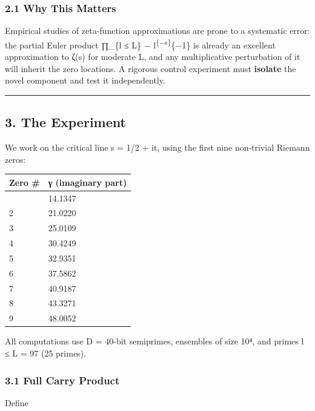 \documentclass[
  11pt,
]{article}
\begin{document}
\subsubsection{2.1 Why This Matters}\label{why-this-matters}

Empirical studies of zeta-function approximations are prone to a systematic
error: the partial Euler product ∏\_\{l ≤ L\}  −
l\textsuperscript{\{−s\}\textbar{}}\{−1\} is already an excellent approximation
to \textbar ζ(s)\textbar{} for moderate L, and any multiplicative perturbation
of it will inherit the zero locations. A rigorous control experiment must
\textbf{isolate} the novel component and test it independently.

\begin{center}\rule{0.5\linewidth}{0.5pt}\end{center}

\newpage

\subsection{3. The Experiment}\label{the-experiment}

We work on the critical line s = 1/2 + it, using the first nine non-trivial
Riemann zeros:

\begin{longtable}[]{@{}ll@{}}
\toprule\noalign{}
Zero \# & γ (imaginary part) \\
\midrule\noalign{}
\endhead
\bottomrule\noalign{}
\endlastfoot
1 & 14.1347 \\
2 & 21.0220 \\
3 & 25.0109 \\
4 & 30.4249 \\
5 & 32.9351 \\
6 & 37.5862 \\
7 & 40.9187 \\
8 & 43.3271 \\
9 & 48.0052 \\
\end{longtable}

All computations use D = 40-bit semiprimes, ensembles of size 10⁴, and primes l
≤ L = 97 (25 primes).

\subsubsection{3.1 Full Carry Product}\label{full-carry-product}

Define
\end{document}
